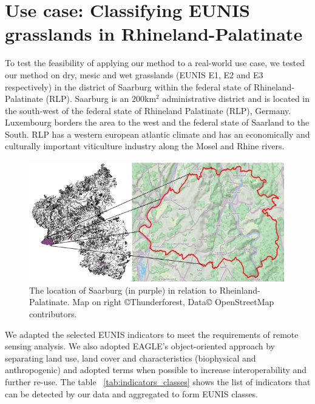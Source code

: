 \documentclass[authoryear, review,12pt,number]{elsarticle}
\begin{document}
\section{Use case: Classifying EUNIS grasslands in Rhineland-Palatinate}
\label{sec:usecase_data}
To test the feasibility of applying our method to a real-world use case, we 
tested our method on dry, mesic and wet grasslands (EUNIS E1, E2 and E3 
respectively) in the district of Saarburg within the federal state of 
Rhineland-Palatinate (RLP). 
Saarburg is an 200km$^{2}$ administrative district and is located in the
south-west of the federal state of Rhineland Palatinate (RLP), Germany.
Luxembourg borders the area to the west and the federal state of Saarland to
the South. RLP has a western european atlantic climate and has an economically
and culturally important viticulture industry along the Mosel and Rhine rivers.
\begin{figure}
\label{fig:study_area}
    \includegraphics[width=\textwidth]{diagrams/study_area_closeup.png}
    \caption{The location of Saarburg (in purple) in relation to
    Rheinland-Palatinate. Map on right \copyright Thunderforest, Data\copyright
    OpenStreetMap contributors.}
\end{figure}
We adapted the selected EUNIS indicators to meet the requirements of remote
sensing analysis. We also adopted EAGLE's object-oriented approach by separating
land use, land cover and characteristics (biophysical and anthropogenic) and
adopted terms when possible to increase interoperability and further re-use.
The table ~\ref{tab:indicators_classes} shows the list of indicators that can be
detected by our data and aggregated to form EUNIS classes. 
\end{document}
